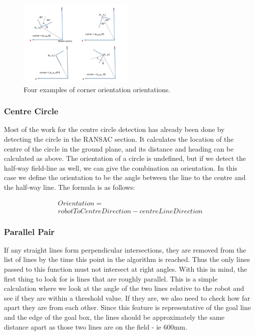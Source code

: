 \documentclass{article}
\begin{document}
\begin{figure}[H]
\centering
\includegraphics[width=0.5\textwidth]{Pictures/orientation.png}
\caption{Four examples of corner orientation orientations.}
\label{fig:corners}
\end{figure}

\subsubsection{Centre Circle}
Most of the work for the centre circle detection has already been done by detecting the circle in the RANSAC section. It calculates the location of the centre of the circle in the ground plane, and its distance and heading can be calculated as above. The orientation of a circle is undefined, but if we detect the half-way field-line as well, we can give the combination an orientation. In this case we define the orientation to be the angle between the line to the centre and the half-way line. The formula is as follows:

\begin{eqnarray}
& Orientation = \nonumber \\ 
& robotToCentreDirection - centreLineDirection
\end{eqnarray}



\subsubsection{Parallel Pair}
If any straight lines form perpendicular intersections, they are removed from the list of lines by the time this point in the algorithm is reached. Thus the only lines passed to this function must not intersect at right angles. With this in mind, the first thing to look for is lines that are roughly parallel. This is a simple calculation where we look at the angle of the two lines relative to the robot and see if they are within a threshold value. If they are, we also need to check how far apart they are from each other. Since this feature is representative of the goal line and the edge of the goal box, the lines should be approximately the same distance apart as those two lines are on the field - ie 600mm. 
\end{document}
